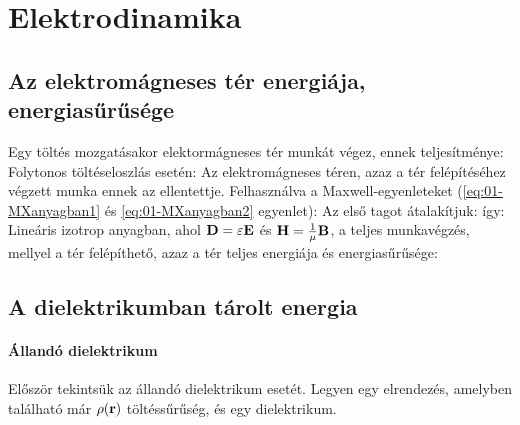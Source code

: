  \section{Elektrodinamika}
  
  \subsection{Az elektromágneses tér energiája, energiasűrűsége}\label{ss-7:elterenergia}
   
   Egy töltés mozgatásakor elektormágneses tér munkát végez, ennek teljesítménye:
   Folytonos töltéseloszlás esetén:
   Az elektromágneses téren, azaz a tér felépítéséhez végzett munka ennek az ellentettje. Felhasználva a Maxwell-egyenleteket (\eqref{eq:01-MXanyagban1} és \eqref{eq:01-MXanyagban2} egyenlet):
   Az első tagot átalakítjuk:
   így:
   Lineáris izotrop anyagban, ahol $\mathbf{D}=\varepsilon\mathbf{E}$ és $\mathbf{H}=\frac{1}{\mu}\mathbf{B}$, a teljes munkavégzés, mellyel a tér felépíthető, azaz a tér teljes energiája és energiasűrűsége:
   
  \subsection{A dielektrikumban tárolt energia}
   
   \paragraph{Állandó dielektrikum}
    Először tekintsük az állandó dielektrikum esetét. Legyen egy elrendezés, amelyben található már $\rho(\mathbf{r})$ töltéssűrűség, és egy dielektrikum.
    
